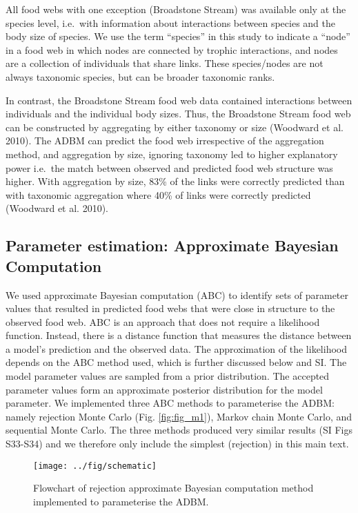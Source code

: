 \documentclass{article}
\begin{document}
All food webs with one exception (Broadstone Stream) was available only
at the species level, i.e.~with information about interactions between
species and the body size of species. We use the term ``species'' in
this study to indicate a ``node'' in a food web in which nodes are
connected by trophic interactions, and nodes are a collection of
individuals that share links. These species/nodes are not always
taxonomic species, but can be broader taxonomic ranks.

In contrast, the Broadstone Stream food web data contained interactions
between individuals and the individual body sizes. Thus, the Broadstone
Stream food web can be constructed by aggregating by either taxonomy or
size (Woodward et al. 2010). The ADBM can predict the food web
irrespective of the aggregation method, and aggregation by size,
ignoring taxonomy led to higher explanatory power i.e.~the match between
observed and predicted food web structure was higher. With aggregation
by size, 83\% of the links were correctly predicted than with taxonomic
aggregation where 40\% of links were correctly predicted (Woodward et
al. 2010).

\hypertarget{parameter-estimation-approximate-bayesian-computation}{%
\subsection{Parameter estimation: Approximate Bayesian
Computation}\label{parameter-estimation-approximate-bayesian-computation}}

We used approximate Bayesian computation (ABC) to identify sets of
parameter values that resulted in predicted food webs that were close in
structure to the observed food web. ABC is an approach that does not
require a likelihood function. Instead, there is a distance function
that measures the distance between a model's prediction and the observed
data. The approximation of the likelihood depends on the ABC method
used, which is further discussed below and SI. The model parameter
values are sampled from a prior distribution. The accepted parameter
values form an approximate posterior distribution for the model
parameter. We implemented three ABC methods to parameterise the ADBM:
namely rejection Monte Carlo (Fig. \ref{fig:fig_m1}), Markov chain Monte
Carlo, and sequential Monte Carlo. The three methods produced very
similar results (SI Figs S33-S34) and we therefore only include the
simplest (rejection) in this main text.

\begin{figure}

{\centering \texttt{[image: ../fig/schematic]} 

}

\caption{\label{fig:fig_m1} Flowchart of rejection approximate Bayesian computation method implemented to parameterise the ADBM.}\label{fig:unnamed-chunk-3}
\end{figure}
\end{document}

